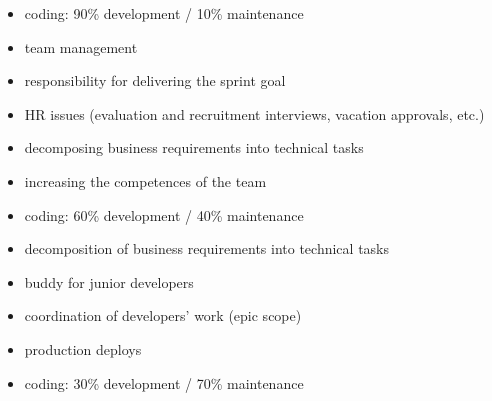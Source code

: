 \documentclass{my_cv}
\begin{document}
\begin{adjustwidth}{2em}{0em}

\begin{flushleft}{}\end{flushleft}
\begin{itemize}
    \item coding: 90\% development / 10\% maintenance
    \item team management
    \item responsibility for delivering the sprint goal
    \item HR issues (evaluation and recruitment interviews, vacation approvals, etc.)
    \item decomposing business requirements into technical tasks
    \item increasing the competences of the team
\end{itemize}
\vspace{0.5em}

\begin{flushleft}{}\end{flushleft}
\begin{itemize}
    \item coding: 60\% development / 40\% maintenance
    \item decomposition of business requirements into technical tasks
    \item buddy for junior developers
    \item coordination of developers' work (epic scope)
    \item production deploys
\end{itemize}
\vspace{0.5em}

\begin{flushleft}{}\end{flushleft}
\begin{itemize}
    \item coding: 30\% development / 70\% maintenance
\end{itemize}
\vspace{0.5em}


\end{adjustwidth}
\end{document}
